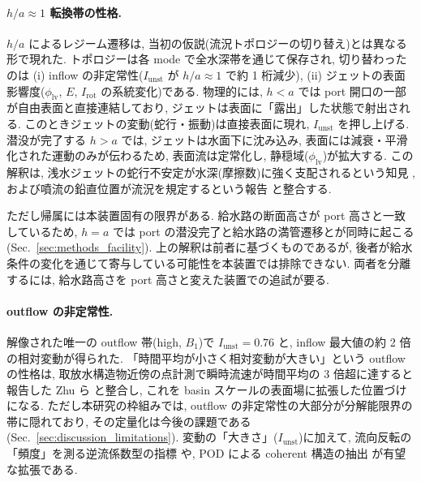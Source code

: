 \paragraph{$h/a \approx 1$ 転換帯の性格.}
$h/a$ によるレジーム遷移は, 当初の仮説(流況トポロジーの切り替え)とは異なる形で現れた. トポロジーは各 mode で全水深帯を通じて保存され, 切り替わったのは (i) inflow の非定常性($I_{\mathrm{unst}}$ が $h/a \approx 1$ で約 1 桁減少), (ii) ジェットの表面影響度($\phi_{\mathrm{lv}}$, $E$, $I_{\mathrm{rot}}$ の系統変化)である. 物理的には, $h < a$ では port 開口の一部が自由表面と直接連結しており, ジェットは表面に「露出」した状態で射出される. このときジェットの変動(蛇行・振動)は直接表面に現れ, $I_{\mathrm{unst}}$ を押し上げる. 潜没が完了する $h > a$ では, ジェットは水面下に沈み込み, 表面には減衰・平滑化された運動のみが伝わるため, 表面流は定常化し, 静穏域($\phi_{\mathrm{lv}}$)が拡大する. この解釈は, 浅水ジェットの蛇行不安定が水深(摩擦数)に強く支配されるという知見 \cite{peltierExperimentalInvestigationMeandering2014}, および噴流の鉛直位置が流況を規定するという報告 \cite{chagdaliFlowPatternsShallow2025} と整合する.

ただし帰属には本装置固有の限界がある. 給水路の断面高さが port 高さと一致しているため, $h=a$ では port の潜没完了と給水路の満管遷移とが同時に起こる(Sec.~\ref{sec:methods_facility}). 上の解釈は前者に基づくものであるが, 後者が給水条件の変化を通じて寄与している可能性を本装置では排除できない. 両者を分離するには, 給水路高さを port 高さと変えた装置での追試が要る.

\paragraph{outflow の非定常性.}
解像された唯一の outflow 帯(high, $B_1$)で $I_{\mathrm{unst}} = 0.76$ と, inflow 最大値の約 2 倍の相対変動が得られた. 「時間平均が小さく相対変動が大きい」という outflow の性格は, 取放水構造物近傍の点計測で瞬時流速が時間平均の 3 倍超に達すると報告した Zhu ら \cite{zhuExperimentalInvestigationUnsteady2023} と整合し, これを basin スケールの表面場に拡張した位置づけになる. ただし本研究の枠組みでは, outflow の非定常性の大部分が分解能限界の帯に隠れており, その定量化は今後の課題である(Sec.~\ref{sec:discussion_limitations}). 変動の「大きさ」($I_{\mathrm{unst}}$)に加えて, 流向反転の「頻度」を測る逆流係数型の指標 \cite{guoCharacteristicsFlowStructure2024} や, POD による coherent 構造の抽出 \cite{peltierExperimentalInvestigationMeandering2014,valeroUnsteadyShallowMeandering2022} が有望な拡張である.

